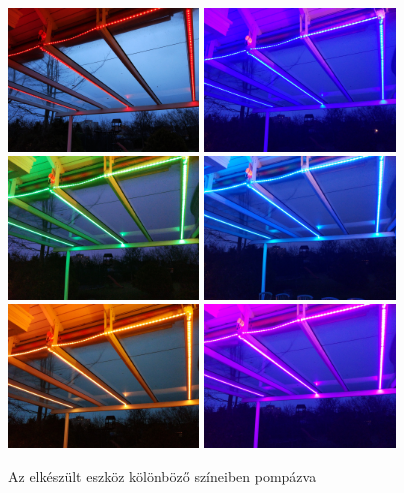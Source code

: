 \documentclass[../main.tex]{subfiles}
\begin{document}
        \begin{figure}[h!]
            \centering
                \includegraphics[height=3.8cm]{resources/alk_res/1_red}
                \includegraphics[height=3.8cm]{resources/alk_res/2_purpule_blue}
                \includegraphics[height=3.8cm]{resources/alk_res/3_green}
                \includegraphics[height=3.8cm]{resources/alk_res/6_light_blue}
                \includegraphics[height=3.8cm]{resources/alk_res/4_orange}
                \includegraphics[height=3.8cm]{resources/alk_res/5_pink}
            \caption{Az elkészült eszköz kölönböző színeiben pompázva}
            \label{fig:pic_terasz}
        \end{figure}
\end{document}
